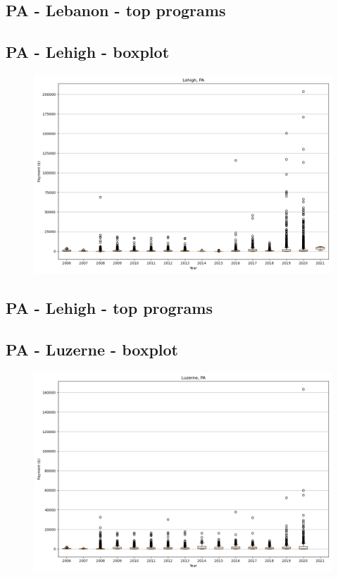 \subsection*{PA - Lebanon - top programs}

\newpage
\subsection*{PA - Lehigh - boxplot}
\begin{figure}[h]
\centering
\includegraphics[width=7in]{../output/boxplots/counties/Lehigh-PA_boxplot.png}
\end{figure}


\subsection*{PA - Lehigh - top programs}

\newpage
\subsection*{PA - Luzerne - boxplot}
\begin{figure}[h]
\centering
\includegraphics[width=7in]{../output/boxplots/counties/Luzerne-PA_boxplot.png}
\end{figure}


